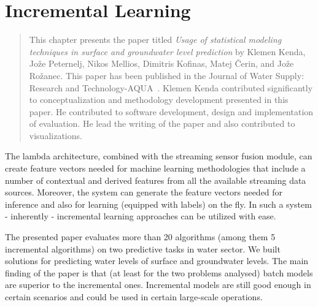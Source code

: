 


\section{Incremental Learning}
\label{section:incremental_learning}

\begin{quote}
This chapter presents the paper titled \textit{Usage of statistical modeling techniques in surface and groundwater level prediction} by Klemen Kenda, Jože Peternelj, Nikos Mellios, Dimitris Kofinas, Matej Čerin, and Jože Rožanec.
This paper has been published in the Journal of Water Supply: Research and Technology-AQUA~\cite{kenda:2020:water-modeling}.
Klemen Kenda contributed significantly to conceptualization and methodology development presented in this paper. 
He contributed to software development, design and implementation of evaluation.
He lead the writing of the paper and also contributed to visualizations.
\end{quote}

The lambda architecture, combined with the streaming sensor fusion module, can create feature vectors needed for machine learning methodologies that include a number of contextual and derived features from all the available streaming data sources.
Moreover, the system can generate the feature vectors needed for inference and also for learning (equipped with labels) on the fly.
In such a system - inherently - incremental learning approaches can be utilized with ease.

The presented paper evaluates more than 20 algorithms (among them 5 incremental algorithms) on two predictive tasks in water sector.
We built solutions for predicting water levels of surface and groundwater levels.
The main finding of the paper is that (at least for the two problems analysed) batch models are superior to the incremental ones.
Incremental models are still good enough in certain scenarios and could be used in certain large-scale operations.

